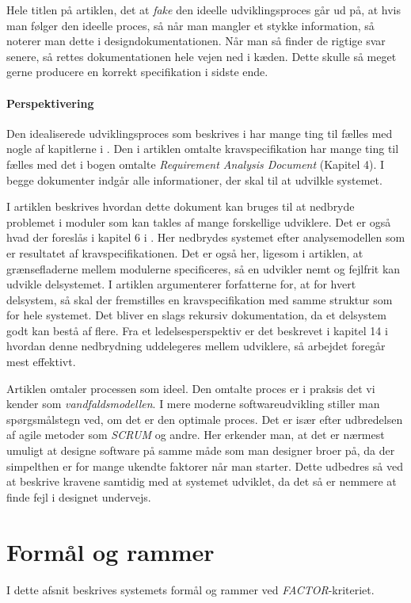 \documentclass[11pt, a4paper]{article}
\begin{document}
Hele titlen på artiklen, det at \emph{fake} den ideelle udviklingsproces går ud på, at hvis man følger den ideelle proces, så når man mangler et stykke information, så noterer man dette i designdokumentationen. Når man så finder de rigtige svar senere, så rettes dokumentationen hele vejen ned i kæden. Dette skulle så meget gerne producere en korrekt specifikation i sidste ende.

\paragraph{Perspektivering}
Den idealiserede udviklingsproces som beskrives i \cite{parnas1986rational} har mange ting til fælles med nogle af kapitlerne i \cite{OOSE}. Den i artiklen omtalte kravspecifikation har mange ting til fælles med det i bogen omtalte \emph{Requirement Analysis Document} (Kapitel 4). I begge dokumenter indgår alle informationer, der skal til at udvilkle systemet.

I artiklen beskrives hvordan dette dokument kan bruges til at nedbryde problemet i moduler som kan takles af mange forskellige udviklere. Det er også hvad der foreslås i kapitel 6 i \cite{OOSE}. Her nedbrydes systemet efter analysemodellen som er resultatet af kravspecifikationen. Det er også her, ligesom i artiklen, at grænsefladerne mellem modulerne specificeres, så en udvikler nemt og fejlfrit kan udvikle delsystemet. I artiklen argumenterer forfatterne for, at for hvert delsystem, så skal der fremstilles en kravspecifikation med samme struktur som for hele systemet. Det bliver en slags rekursiv dokumentation, da et delsystem godt kan bestå af flere. Fra et ledelsesperspektiv er det beskrevet i kapitel 14 i \cite{OOSE} hvordan denne nedbrydning uddelegeres mellem udviklere, så arbejdet foregår mest effektivt.

Artiklen omtaler processen som ideel. Den omtalte proces er i praksis det vi kender som \emph{vandfaldsmodellen}. I mere moderne softwareudvikling stiller man spørgsmålstegn ved, om det er den optimale proces. Det er især efter udbredelsen af agile metoder som \emph{SCRUM} \cite{sutherland2010jeff} og andre. Her erkender man, at det er nærmest umuligt at designe software på samme måde som man designer broer på, da der simpelthen er for mange ukendte faktorer når man starter. Dette udbedres så ved at beskrive kravene samtidig med at systemet udviklet, da det så er nemmere at finde fejl i designet undervejs.

\newpage
\section{Formål og rammer}
\label{sec:formal_og_rammer}
I dette afsnit beskrives systemets formål og rammer ved \textit{FACTOR}-kriteriet.
\end{document}
